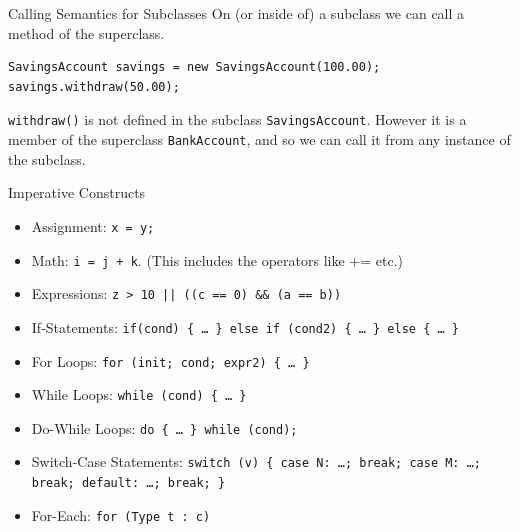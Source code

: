 \documentclass[aspectratio=169]{beamer}
\begin{document}
\begin{frame}[fragile]{Calling Semantics for Subclasses}
On (or inside of) a subclass we can call a method of the superclass. \\
\vspace{1em}
\begin{Verbatim}
SavingsAccount savings = new SavingsAccount(100.00);
savings.withdraw(50.00);
\end{Verbatim}
\vspace{1em}
\texttt{withdraw()} is not defined in the subclass \texttt{SavingsAccount}. However it is a member of the superclass \texttt{BankAccount}, and so we can call it from any instance of the subclass.
\end{frame}



\begin{frame}{Imperative Constructs}
\begin{itemize}
\item Assignment: {\tt x = y;}
\item Math: {\tt i = j + k}. (This includes the operators like += etc.)
\item Expressions: {\tt z > 10 || ((c == 0) \&\& (a == b))}
\item If-Statements: {\tt if(cond) \{ \ldots~\} else if (cond2) \{ \ldots~\}  else  \{ \ldots~\} }
\item For Loops: {\tt for (init; cond; expr2) \{ \ldots~\} }
\item While Loops: {\tt while (cond) \{ \ldots~\} }
\item Do-While Loops: {\tt do \{ \ldots~\} while (cond); }
\item Switch-Case Statements: {\tt switch (v) \{ case N: \ldots; break; case M: \ldots; break; default: \ldots; break; \} }
\item For-Each: {\tt for (Type t : c)}
\end{itemize}
\end{frame}
\end{document}
